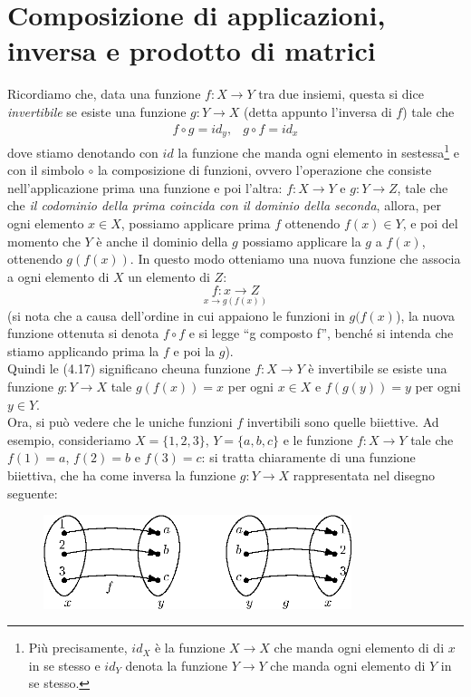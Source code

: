 \documentclass{book}
\begin{document}
\section{Composizione di applicazioni, inversa e prodotto di matrici}
Ricordiamo che, data una funzione $f:X\to Y$ tra due insiemi, questa si dice \textit{invertibile} se esiste una
funzione $g:Y\to X$ (detta appunto l'inversa di $f$) tale che
\begin{eqnarray}
  f\circ g=id_y, & g\circ f = id_x
\end{eqnarray}
dove stiamo denotando con $id$ la funzione che manda ogni elemento in sestessa\footnote{Più precisamente, $id_X$
  è la funzione $X\to X$ che manda ogni elemento di di $x$ in se stesso e $id_Y$ denota la funzione $Y\to Y$ che
  manda ogni elemento di $Y$ in se stesso.} e con il simbolo $\circ$ la composizione di funzioni, ovvero
l'operazione che consiste nell'applicazione prima una funzione e poi l'altra: $f:X\to Y$ e $g: Y\to Z$, tale che
che \textit{il codominio della prima coincida con il dominio della seconda}, allora, per ogni elemento $x\in X$,
possiamo applicare prima $f$ ottenendo $f(x)\in Y$, e poi del momento che $Y$ è anche il dominio della $g$
possiamo applicare la $g$ a $f(x)$, ottenendo $g(f(x))$. In questo modo otteniamo una nuova funzione che associa
a ogni elemento di $X$ un elemento di $Z$:
\begin{equation*}
  \underset{x\to g(f(x))}{f:x\to Z}
\end{equation*}
(si nota che a causa dell'ordine in cui appaiono le funzioni in $g(f(x)$), la nuova funzione ottenuta si denota
$f\circ f$ e si legge ``g composto f'', benché si intenda che stiamo applicando prima la $f$ e poi la $g$).\\
Quindi le (4.17) significano cheuna funzione $f:X\to Y$ è invertibile se esiste una funzione $g:Y\to X$ tale
$g(f(x))=x$ per ogni $x\in X$ e $f(g(y))=y$ per ogni $y\in Y$.\\
Ora, si può vedere che le uniche funzioni $f$ invertibili sono quelle biiettive. Ad esempio, consideriamo
$X=\{1,2,3\}$, $Y=\{a,b,c\}$ e le funzione $f:X\to Y$ tale che $f(1)=a$, $f(2)=b$ e $f(3)=c$: si tratta
chiaramente di una funzione biiettiva, che ha come inversa la funzione $g:Y\to X$ rappresentata nel disegno
seguente:
\begin{figure}[ht]
  \centering
  \includegraphics[width=9cm]{img/finiti/imgex4-5-1.eps}
\end{figure}
\end{document}
